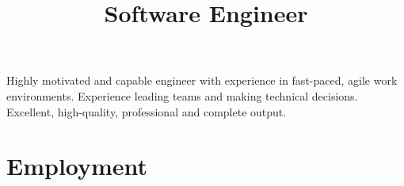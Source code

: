\documentclass[11pt,a4paper,sans]{moderncv}        %
\title{Software Engineer}                               %
\begin{document}
\makecvtitle

\small{  Highly motivated and capable engineer with experience in fast-paced, agile work environments. Experience leading teams and making technical decisions. Excellent, high-quality, professional and complete output. }

\section{Employment}

\vspace{6pt}
\end{document}
